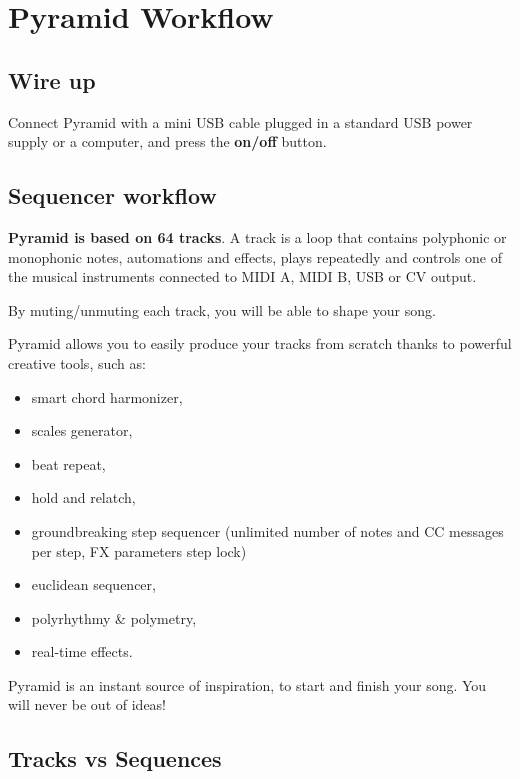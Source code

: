 \section{Pyramid Workflow}

\subsection{Wire up}

Connect Pyramid with a mini USB cable plugged in a standard USB power supply or a computer, and press the \textbf{on/off} button.


\subsection{Sequencer workflow}

\textbf{Pyramid is based on 64 tracks}. A track is a loop that contains polyphonic or monophonic notes, automations and effects, plays repeatedly and controls one of the musical instruments connected to MIDI A, MIDI B, USB or CV output.

By muting/unmuting each track, you will be able to shape your song.


Pyramid allows you to easily produce your tracks from scratch thanks to powerful creative tools, such as:
\begin{itemize} %
\item smart chord harmonizer,
\item scales generator,
\item beat repeat,
\item hold and relatch,
\item groundbreaking step sequencer (unlimited number of notes and CC messages per step, FX parameters step lock)
\item euclidean sequencer,
\item polyrhythmy \& polymetry,
\item real-time effects.
\end{itemize}

Pyramid is an instant source of inspiration, to start and finish your song. You will never be out of ideas!


\subsection{Tracks vs Sequences} 

